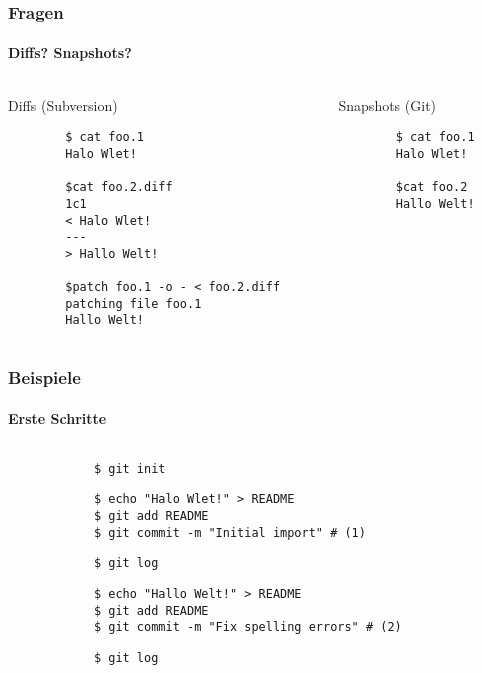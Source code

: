 \documentclass[]{beamer}
\begin{document}
\begin{frame}[fragile]
	\frametitle{Fragen}
	\framesubtitle{Diffs? Snapshots?}
	\begin{columns}[T]
		\begin{column}{4.5cm}
		\huge{Diffs} \normalsize (Subversion)

		\begin{verbatim}
		$ cat foo.1
		Halo Wlet!

		$cat foo.2.diff
		1c1
		< Halo Wlet!
		---
		> Hallo Welt!

		$patch foo.1 -o - < foo.2.diff
		patching file foo.1
		Hallo Welt!
		\end{verbatim}
		\end{column}

		\begin{column}{4.5cm}
		\huge{Snapshots} \normalsize (Git)

		\begin{verbatim}
		$ cat foo.1
		Halo Wlet!

		$cat foo.2
		Hallo Welt!
		\end{verbatim}
		\end{column}
	\end{columns}
\end{frame}

\begin{frame}[fragile]
	\frametitle{Beispiele}
	\framesubtitle{Erste Schritte}
	\begin{columns}[T]
		\begin{column}{7.5cm}
			\begin{verbatim}
			$ git init
			\end{verbatim}

			\begin{verbatim}
			$ echo "Halo Wlet!" > README
			$ git add README
			$ git commit -m "Initial import" # (1)
			\end{verbatim}

			\begin{verbatim}
			$ git log
			\end{verbatim}

			\begin{verbatim}
			$ echo "Hallo Welt!" > README
			$ git add README
			$ git commit -m "Fix spelling errors" # (2)
			\end{verbatim}

			\begin{verbatim}
			$ git log
			\end{verbatim}
		\end{column}
		\begin{column}{2.5cm}
		\end{column}
	\end{columns}
\end{frame}
\end{document}
